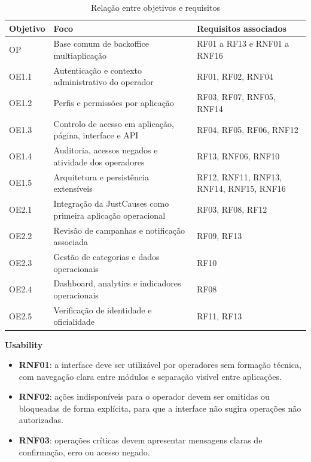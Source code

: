 \begin{table}[H]
\caption{Relação entre objetivos e requisitos}
\label{tab:mapeamento_objetivos_requisitos}
\begin{center}
\small
\begin{tabular}{|p{2.2cm}|p{5.2cm}|p{5.4cm}|}
\hline
\textbf{Objetivo} & \textbf{Foco} & \textbf{Requisitos associados} \\ \hline
OP & Base comum de backoffice multiaplicação & RF01 a RF13 e RNF01 a RNF16 \\ \hline
OE1.1 & Autenticação e contexto administrativo do operador & RF01, RF02, RNF04 \\ \hline
OE1.2 & Perfis e permissões por aplicação & RF03, RF07, RNF05, RNF14 \\ \hline
OE1.3 & Controlo de acesso em aplicação, página, interface e \gls{API} & RF04, RF05, RF06, RNF12 \\ \hline
OE1.4 & Auditoria, acessos negados e atividade dos operadores & RF13, RNF06, RNF10 \\ \hline
OE1.5 & Arquitetura e persistência extensíveis & RF12, RNF11, RNF13, RNF14, RNF15, RNF16 \\ \hline
OE2.1 & Integração da JustCauses como primeira aplicação operacional & RF03, RF08, RF12 \\ \hline
OE2.2 & Revisão de campanhas e notificação associada & RF09, RF13 \\ \hline
OE2.3 & Gestão de categorias e dados operacionais & RF10 \\ \hline
OE2.4 & Dashboard, analytics e indicadores operacionais & RF08 \\ \hline
OE2.5 & Verificação de identidade e oficialidade & RF11, RF13 \\ \hline
\end{tabular}
\end{center}
\end{table}

\noindent\textbf{Usability}
\begin{itemize}
  \item \textbf{RNF01}: a interface deve ser utilizável por operadores sem formação técnica, com navegação clara entre módulos e separação visível entre aplicações.
  \item \textbf{RNF02}: ações indisponíveis para o operador devem ser omitidas ou bloqueadas de forma explícita, para que a interface não sugira operações não autorizadas.
  \item \textbf{RNF03}: operações críticas devem apresentar mensagens claras de confirmação, erro ou acesso negado.
\end{itemize}

